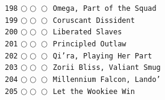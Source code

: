 \documentclass[a4paper,landscape]{article}
\begin{document}
\begin{multicols*}{5}
\texttt{198} \(\bigcirc\!\bigcirc\!\bigcirc\)  \texttt{Omega, Part of the Squad} \vspace{-0.3mm}\\ 
\texttt{199} \(\bigcirc\!\bigcirc\!\bigcirc\)  \texttt{Coruscant Dissident} \vspace{-0.3mm}\\ 
\texttt{200} \(\bigcirc\!\bigcirc\!\bigcirc\)  \texttt{Liberated Slaves} \vspace{-0.3mm}\\ 
\texttt{201} \(\bigcirc\!\bigcirc\!\bigcirc\)  \texttt{Principled Outlaw} \vspace{-0.3mm}\\ 
\texttt{202} \(\bigcirc\!\bigcirc\!\bigcirc\)  \texttt{Qi’ra, Playing Her Part} \vspace{-0.3mm}\\ 
\texttt{203} \(\bigcirc\!\bigcirc\!\bigcirc\)  \texttt{Zorii Bliss, Valiant Smug} \vspace{-0.3mm}\\ 
\texttt{204} \(\bigcirc\!\bigcirc\!\bigcirc\)  \texttt{Millennium Falcon, Lando’} \vspace{-0.3mm}\\ 
\texttt{205} \(\bigcirc\!\bigcirc\!\bigcirc\)  \texttt{Let the Wookiee Win} \vspace{-0.3mm}\\ 

\end{multicols*}
\end{document}
